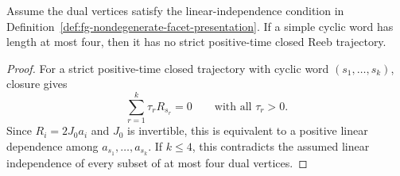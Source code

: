 \begin{unverified}
\begin{lemma}%
\label{lem:fg-short-words-no-positive-orbit}
Assume the dual vertices satisfy the linear-independence condition in
Definition~\ref{def:fg-nondegenerate-facet-presentation}.  If a simple cyclic word
has length at most four, then it has no strict positive-time closed Reeb
trajectory.
\end{lemma}

\begin{proof}
For a strict positive-time closed trajectory with cyclic word
\((s_1,\ldots,s_k)\), closure gives
\[
  \sum_{r=1}^k \tau_r R_{s_r}=0
  \qquad\text{with all }\tau_r>0.
\]
Since \(R_i=2J_0a_i\) and \(J_0\) is invertible, this is equivalent to a
positive linear dependence among \(a_{s_1},\ldots,a_{s_k}\).  If \(k\le4\),
this contradicts the assumed linear independence of every subset of at most
four dual vertices.
\end{proof}
\end{unverified}

